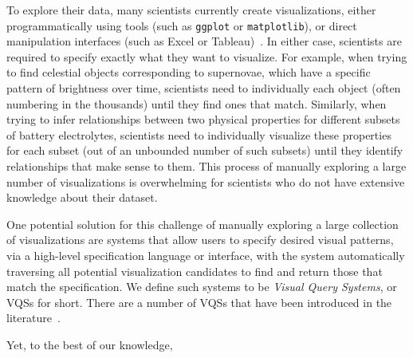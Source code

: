 To explore their data, many scientists currently
create visualizations, either programmatically using 
tools (such as {\tt ggplot} or {\tt matplotlib}),
or direct manipulation interfaces (such as 
Excel or Tableau)~\cite{Momcheva2015,Prabhu2011,Duck2016}. 
In either case, scientists are required to specify exactly what
they want to visualize.  For example, when trying to find celestial objects
corresponding to supernovae, which have a specific pattern
of brightness over time, scientists
need to individually  
each object (often numbering in the thousands) until they find ones that match. 
Similarly, when trying to infer relationships between two physical
properties for different subsets of battery electrolytes,
scientists need to individually visualize these properties
for each subset (out of an unbounded number of such subsets)
until they identify relationships that make sense to them. This process of manually exploring a large number of visualizations 
is  overwhelming for scientists who do not have extensive knowledge about their
dataset. 
\par One potential solution for this challenge of manually exploring a large collection of visualizations
are systems that allow users to specify 
desired visual patterns, via a high-level specification language
or interface, with the system automatically
traversing all potential visualization candidates to find
and return those that match the specification. 
We define such systems to be {\em Visual Query Systems}, or VQSs for short.
There are a number of VQSs that have been introduced in the literature~\cite{mohebbi2011google,Hochheiser2004,wattenberg2001sketching,Siddiqui2017VLDB,ryall2005querylines,holz2009relaxed}. 
\par {}
Yet, to the best of our knowledge, 
